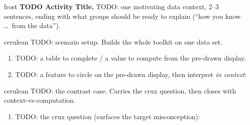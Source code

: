 \documentclass[12pt]{article}
\newcommand{\answerspace}[2]{\par\nopagebreak\noindent\begin{minipage}[t][#1][t]{\linewidth}%
  \color{keyred}\bfseries #2\end{minipage}\par}
\begin{document}

\vspace{0.06in}

\begin{headlinebox}{frost}
\textbf{TODO Activity Title.} TODO: one motivating data context, 2--3 sentences, ending with what
groups should be ready to explain (``how you know \dots\ from the data'').
\end{headlinebox}

\vspace{0.04in}

\begin{scenariobox}{cerulean}
TODO: scenario setup. Builds the whole toolkit on one data set.
\begin{enumerate}[label=\textbf{\alph*.}, leftmargin=1.8em, itemsep=8pt]
  \item TODO: a table to complete / a value to compute from the pre-drawn display.
  \item TODO: a feature to circle on the pre-drawn display, then interpret \emph{in context}:
        \answerspace{2.0cm}{}
\end{enumerate}
\end{scenariobox}

\boxguard[16]
\begin{scenariobox}{cerulean}
TODO: the contrast case. Carries the crux question, then closes with context-vs-computation.
\begin{enumerate}[label=\textbf{\alph*.}, leftmargin=1.8em, itemsep=8pt]
  \item TODO: the crux question (surfaces the target misconception):
        \answerspace{2.6cm}{}
\end{enumerate}
\end{scenariobox}
\end{document}
